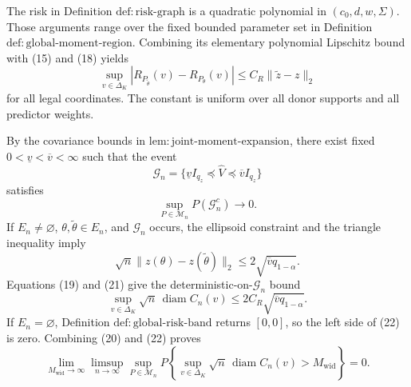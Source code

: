 The risk in Definition \(\mathrm{def:risk\mbox{-}graph}\) is a quadratic polynomial in \((c_0,d,w,\Sigma)\).  Those arguments range over the fixed bounded parameter set in Definition \(\mathrm{def:global\mbox{-}moment\mbox{-}region}\).  Combining its elementary polynomial Lipschitz bound with (15) and (18) yields
\[
\sup_{v\in\Delta_K}
|R_{P_{\widetilde\theta}}(v)-R_{P_\theta}(v)|
\leq C_R\|\widetilde z-z\|_2
\tag{19}
\]
for all legal coordinates.  The constant is uniform over all donor supports and all predictor weights.

By the covariance bounds in \(\mathrm{lem:joint\mbox{-}moment\mbox{-}expansion}\), there exist fixed \(0<\underline v<\overline v<\infty\) such that the event
\[
\mathcal G_n=
\{\underline v I_{q_z}\preceq\widehat V
\preceq\overline v I_{q_z}\}
\]
satisfies
\[
\sup_{P\in\mathcal M_n}P(\mathcal G_n^c)\longrightarrow0.
\tag{20}
\]
If \(E_n\neq\varnothing\), \(\theta,\widetilde\theta\in E_n\), and \(\mathcal G_n\) occurs, the ellipsoid constraint and the triangle inequality imply
\[
\sqrt n\|z(\theta)-z(\widetilde\theta)\|_2
\leq2\sqrt{\overline v q_{1-\alpha}}.
\tag{21}
\]
Equations (19) and (21) give the deterministic-on-\(\mathcal G_n\) bound
\[
\sup_{v\in\Delta_K}\sqrt n\,
\operatorname{diam}C_n(v)
\leq2C_R\sqrt{\overline v q_{1-\alpha}}.
\tag{22}
\]
If \(E_n=\varnothing\), Definition \(\mathrm{def:global\mbox{-}risk\mbox{-}band}\) returns \([0,0]\), so the left side of (22) is zero.  Combining (20) and (22) proves
\[
\lim_{M_{\mathrm{wid}}\to\infty}
\limsup_{n\to\infty}
\sup_{P\in\mathcal M_n}
P\!\left\{
\sup_{v\in\Delta_K}\sqrt n\,
\operatorname{diam}C_n(v)>M_{\mathrm{wid}}
\right\}=0.
\]

